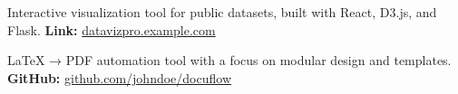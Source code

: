 
Interactive visualization tool for public datasets, built with React, D3.js, and Flask.  
\textbf{Link:} \href{https://datavizpro.example.com}{datavizpro.example.com}

\divider

LaTeX → PDF automation tool with a focus on modular design and templates.  
\textbf{GitHub:} \href{https://github.com/johndoe/docuflow}{github.com/johndoe/docuflow}
